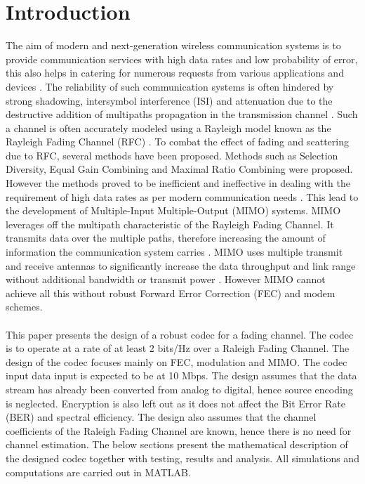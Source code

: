 \documentclass[11pt]{report}
\begin{document}
		
\begin{abstract}
\end{abstract}

\tableofcontents

\newpage

\section{Introduction}
\label{sec:intro}
The aim of modern and next-generation wireless communication systems is to provide communication services with high data rates and low probability of error, this also helps in catering for numerous requests from various applications and devices \cite{36,14,49}. The reliability of such communication systems is often hindered by strong shadowing, intersymbol interference (ISI) and attenuation due to the destructive addition of multipaths propagation in the transmission channel \cite{36,32}. Such a channel is often accurately modeled using a Rayleigh model known as the Rayleigh Fading Channel (RFC) \cite{32}. To combat the effect of fading and scattering due to RFC, several methods have been proposed. Methods such as Selection Diversity, Equal Gain Combining and Maximal Ratio Combining were proposed. However the methods proved to be inefficient and ineffective in dealing with the requirement of high data rates as per modern communication needs \cite{B8}. This lead to the development of Multiple-Input Multiple-Output (MIMO) systems. MIMO leverages off the multipath characteristic of the Rayleigh Fading Channel. It transmits data over the multiple paths, therefore increasing the amount of information the communication system carries \cite{50}. MIMO uses multiple transmit and receive antennas to significantly increase the data throughput and link range without additional bandwidth or transmit power \cite{B6}. However MIMO cannot 
achieve all this without robust Forward Error Correction (FEC) and modem schemes. 
\\
\\
This paper presents the design of a robust codec for a fading channel. The codec is to operate at a rate of at least 2 bits/Hz over a Raleigh Fading Channel. The design of the codec focuses mainly on FEC, modulation and MIMO. The codec input data input is expected to be at 10 Mbps. The design assumes that the data stream has already been converted from analog to digital, hence source encoding is neglected. Encryption is also left out as it does not affect the Bit Error Rate (BER) and spectral efficiency. The design also assumes that the channel coefficients of the Raleigh Fading Channel are known, hence there is no need for channel estimation. The below sections present the mathematical description of the designed codec together with testing, results and analysis. All simulations and computations are carried out in MATLAB.
\end{document}
